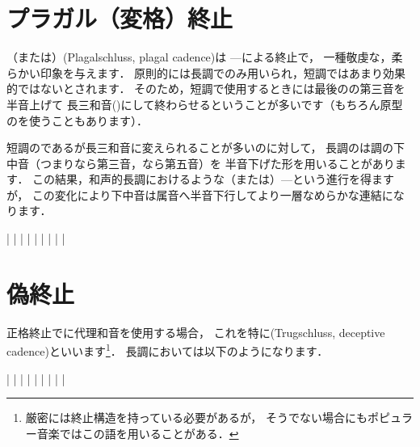 \documentclass[dvipdfmx,uplatex,b5paper,openany,jbase=12Q,nomag*,textwidth-limit=44%
               ]{gachimuchi}[2020/05/05]
\begin{document}
\section{プラガル（変格）終止}
（または）(Plagalschluss, plagal cadence)は
---による終止で，
一種敬虔な，柔らかい印象を与えます．
原則的には長調でのみ用いられ，短調ではあまり効果的ではないとされます．
そのため，短調で使用するときには最後の\Gni\Min の第三音を半音上げて
長三和音(\Gni)にして終わらせるということが多いです（もちろん原型の\Gni\Min を使うこともあります）．

短調のである\Gni\Min が長三和音に変えられることが多いのに対して，
長調のは調の下中音（つまり\Gniv なら第三音，\Gnii なら第五音）を
半音下げた形を用いることがあります．
この結果，和声的長調におけるような\Gniv\Min（または\Gnii\Dimt ）\<---\Gni という進行を得ますが，
この変化により下中音は属音へ半音下行してより一層なめらかな連結になります．

\begin{Music}[.6\linewidth]
  \generalmeter{\meterC}%
  \Startpiece%
  \NOTEs%
  |%
  \en\bar
  \NOTEs%
  |%
  \en\doublebar%
  \NOTEs%
  |%
  \en\bar
  \NOTEs%
  |%
  \en{}\Changecontext%
  \NOTEs%
  |%
  \en\bar
  \NOTEs%
  |%
  \en\setdoublebar
  \endpiece
\end{Music}


\section{偽終止}
正格終止でに代理和音を使用する場合，
これを特に\xkanjispace(Trugschluss, deceptive cadence)といいます\footnote{%
  厳密には終止構造を持っている必要があるが，
  そうでない場合にもポピュラー音楽ではこの語を用いることがある．
}．
長調においては以下のようになります．

\begin{Music}[.6\linewidth]
  \generalmeter{\meterC}%
  \Startpiece%
  \NOTEs%
  |%
  \en\bar%
  \NOTEs%
  |%
  \en\doublebar%
  \NOTEs%
  |%
  \en\bar%
  \NOTEs%
  |%
  \en\doublebar%
  \NOTEs%
  |%
  \en\bar%
  \NOTEs%
  |%
  \en\setdoublebar%
  \endpiece
\end{Music}
\end{document}
